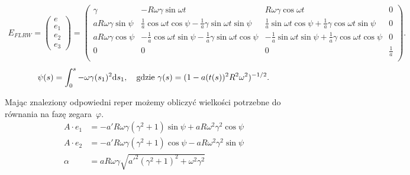 \begin{align}\label{EFLRW}
E_{FLRW} = 
\begin{pmatrix}
e\\
e_1\\
e_2\\
e_3
\end{pmatrix}
=
\begin{pmatrix}
\gamma 	& -R\omega\gamma\sin\omega t 	
& R\omega\gamma\cos\omega t & 0 \\
a R\omega\gamma \sin \psi	
& \frac{1}{a} \cos\omega t \cos\psi - \frac{1}{a}\gamma \sin\omega t \sin\psi
& \frac{1}{a} \sin\omega t \cos\psi + \frac{1}{a}\gamma \cos\omega t \sin\psi
& 0 \\
a R\omega\gamma \cos \psi & -\frac{1}{a} \cos\omega t \sin\psi - 
\frac{1}{a}\gamma \sin\omega t \cos\psi
& -\frac{1}{a} \sin\omega t \sin\psi + 
\frac{1}{a}\gamma \cos\omega t \cos\psi		 & 0 \\
0&	0	& 0	& \frac{1}{a} \\
\end{pmatrix}.
\end{align}
\begin{align}\label{PsiFLRW}
\psi(s) =\int_0^s -\omega \gamma(s_1)^2  \text{d} s_1 , \quad 
\text{gdzie } \gamma(s) = (1-a(t(s))^2R^2\omega^2)^{-1/2}.
\end{align}

Mając znaleziony odpowiedni reper możemy obliczyć wielkości
potrzebne do równania na fazę zegara~$\varphi$.
\begin{align}\nonumber
A\cdot e_1 &= -a'R\omega \gamma \left( \gamma^2+1 \right)\sin\psi
 + a R \omega^2\gamma^2\cos\psi        \\
A\cdot e_2 &= -a'R\omega \gamma \left( \gamma^2+1 \right)\cos\psi
 - a R \omega^2 \gamma^2 \sin \psi      \nonumber  \\ \nonumber
\alpha &= a R \omega \gamma \sqrt{a'^2 \left(\gamma ^2+1\right)^2
 +   \omega^2\gamma^2}
\end{align}



